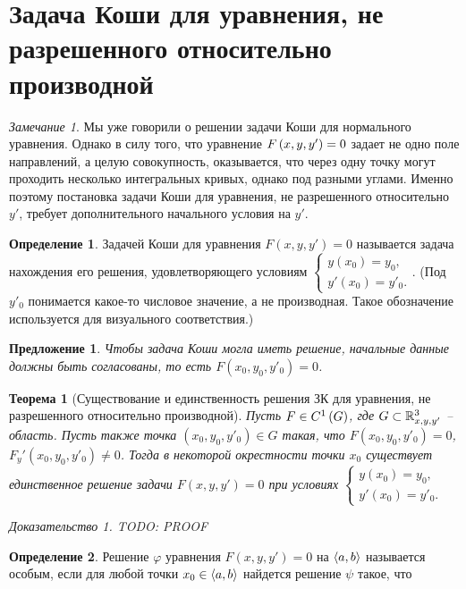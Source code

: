 \documentclass[a5paper, 10pt]{article}
\theoremstyle{definition}
\newtheorem{Def}{Определение}
\theoremstyle{plain}
\newtheorem{Th}{Теорема}
\newtheorem*{Prop}{Предложение}
\theoremstyle{remark}
\newtheorem*{Note}{Замечание}
\newtheorem*{Proof}{Доказательство}
\begin{document}
	\section[Задача Коши]{Задача Коши для уравнения, не разрешенного относительно производной}
	\begin{Note}
		Мы уже говорили о решении задачи Коши для нормального уравнения. Однако в силу того, что уравнение $F\left(x,y,y'\right) = 0$ задает не одно поле направлений, а целую совокупность, оказывается, что через одну точку могут проходить несколько интегральных кривых, однако под разными углами. Именно поэтому постановка задачи Коши для уравнения, не разрешенного относительно $y'$, требует дополнительного начального условия на $y'$.
	\end{Note}
	\begin{Def}
		Задачей Коши для уравнения $F(x,y,y') = 0$ называется задача нахождения его решения, удовлетворяющего условиям $\begin{cases}
			y(x_0) = y_0,\\
			y'(x_0) = y'_0.
		\end{cases}
	$. (Под $y'_0$ понимается какое-то числовое значение, а не производная. Такое обозначение используется для визуального соответствия.) 
	\end{Def}
	\begin{Prop}
		Чтобы задача Коши могла иметь решение, начальные данные должны быть согласованы, то есть $F(x_0, y_0, y'_0) = 0$.
	\end{Prop}
	\begin{Th}[Существование и единственность решения ЗК для уравнения, не разрешенного относительно производной]
		Пусть $F \in C^1\left(G\right)$, где $G \subset \mathbb{R}^3_{x,y,y'}$ -- область. Пусть также точка $(x_0, y_0, y'_0) \in G$ такая, что $F(x_0,y_0, y'_0) =0$, $F_y'(x_0, y_0, y'_0) \neq 0$. Тогда в некоторой окрестности точки $x_0$ существует единственное решение задачи $F(x,y,y') = 0$ при условиях $\begin{cases}
			y(x_0) = y_0,\\
			y'(x_0) = y'_0.
		\end{cases}$
		\begin{Proof}
			TODO: PROOF
		\end{Proof}
	\end{Th}

	\begin{Def}
		Решение $\varphi$ уравнения $F(x, y,y') = 0$ на $\left\langle a,b\right\rangle$ называется особым, если для любой точки $x_0 \in \left\langle a,b\right\rangle$ найдется решение $\psi$ такое, что 
	\end{Def}
\end{document}
